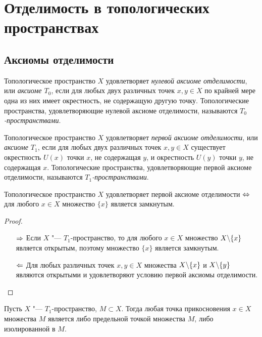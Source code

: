 \section{Отделимость в топологических пространствах}

\subsection{Аксиомы отделимости}

\begin{definition}
    Топологическое пространство $X$ удовлетворяет \textit{нулевой аксиоме отделимости}, или \textit{аксиоме $T_0$}, если для любых двух различных точек $x, y \in X$ по крайней мере одна из них имеет окрестность, не содержащую другую точку. Топологические пространства, удовлетворяющие нулевой аксиоме отделимости, называются \textit{$T_0$-пространствами}.
\end{definition}

\begin{definition}
    Топологическое пространство $X$ удовлетворяет \textit{первой аксиоме отделимости}, или \textit{аксиоме $T_1$}, если для любых двух различных точек $x, y \in X$ существует окрестность $U(x)$ точки $x$, не содержащая $y$, и окрестность $U(y)$ точки $y$, не содержащая $x$. Топологические пространства, удовлетворяющие первой аксиоме отделимости, называются \textit{$T_1$-пространствами}.
\end{definition}

\begin{proposition}
    Топологическое пространство $X$ удовлетворяет первой аксиоме отделимости $\Leftrightarrow$ для любого $x \in X$ множество $\{x\}$ является замкнутым.
\end{proposition}

\begin{proof}~
    \begin{itemize}
        \item[$\Rightarrow$] Если $X$ "--- $T_1$-пространство, то для любого $x \in X$ множество $X \backslash \{x\}$ является открытым, поэтому множество $\{x\}$ является замкнутым. 

        \item[$\Leftarrow$] Для любых различных точек $x, y \in X$ множества $X \backslash \{x\}$ и $X \backslash \{y\}$ являются открытыми и удовлетворяют условию первой аксиомы отделимости.\qedhere
    \end{itemize}
\end{proof}

\begin{proposition}
    Пусть $X$ "--- $T_1$-пространство, $M \subset X$. Тогда любая точка прикосновения $x \in X$ множества $M$ является либо предельной точкой множества $M$, либо изолированной в $M$.
\end{proposition}

